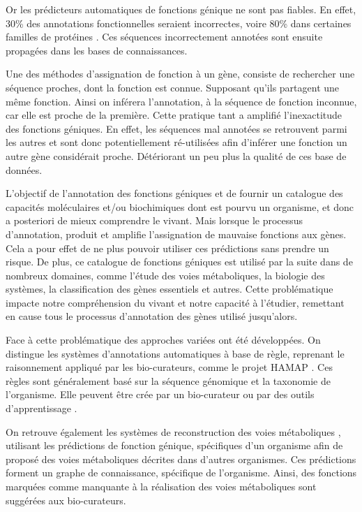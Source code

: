 Or les prédicteurs automatiques de fonctions génique ne sont pas fiables. En effet, 30\% des annotations fonctionnelles seraient incorrectes, voire 80\% dans certaines familles de protéines \parencites{devos2001intrinsic}{schnoes2009annotation}. Ces séquences incorrectement annotées sont ensuite propagées dans les bases de connaissances.

Une des méthodes d'assignation de fonction à un gène, consiste de rechercher une séquence proches, dont la fonction est connue. Supposant qu'ils partagent une même fonction. Ainsi on inférera l'annotation, à la séquence de fonction inconnue, car elle est proche de la première. Cette pratique tant a amplifié l'inexactitude des fonctions géniques. En effet, les séquences mal annotées se retrouvent parmi les autres et sont donc potentiellement ré-utilisées  afin d'inférer une fonction un autre gène considérait proche. Détériorant un peu plus la qualité de ces base de données.

L'objectif de l'annotation des fonctions géniques et de fournir un catalogue des capacités moléculaires et/ou biochimiques dont est pourvu un organisme, et donc a posteriori de mieux comprendre le vivant. Mais lorsque le processus d'annotation, produit et amplifie l'assignation de mauvaise fonctions aux gènes. Cela a pour effet de ne plus pouvoir utiliser ces prédictions sans prendre un risque. De plus, ce catalogue de fonctions géniques est utilisé par la suite dans de nombreux domaines, comme l'étude des voies métaboliques, la biologie des systèmes, la classification des gènes essentiels et autres. Cette problématique impacte notre compréhension du vivant et notre capacité à l'étudier, remettant en cause tous le processus d'annotation des gènes utilisé jusqu'alors.

Face à cette problématique des approches variées ont été développées. On distingue les systèmes d'annotations automatiques à base de règle, reprenant le raisonnement appliqué par les bio-curateurs, comme le projet HAMAP \citep[voir][]{lima2009hamap}. Ces règles sont généralement basé sur la séquence génomique et la taxonomie de l'organisme. Elle peuvent être crée par un bio-curateur ou par des outils d'apprentissage \citep[voir][]{uniprot2011ongoing}.

On retrouve également les systèmes de reconstruction des voies métaboliques \citep[voir][]{karpe2011pathway}, utilisant les prédictions de fonction génique, spécifiques d'un organisme afin de proposé des voies métaboliques décrites dans d'autres organismes. Ces prédictions forment un graphe de connaissance, spécifique de l'organisme. Ainsi, des fonctions marquées comme manquante à la réalisation des voies métaboliques sont suggérées aux bio-curateurs.

